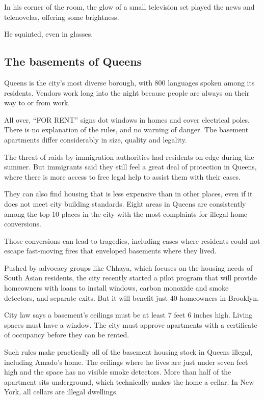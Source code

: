 In his corner of the room, the glow of a small television set played the
news and telenovelas, offering some brightness.

He squinted, even in glasses.

\hypertarget{the-basements-of-queens}{%
\subsection{The basements of Queens}\label{the-basements-of-queens}}

Queens is the city's most diverse borough, with 800 languages spoken
among its residents. Vendors work long into the night because people are
always on their way to or from work.

All over, ``FOR RENT'' signs dot windows in homes and cover electrical
poles. There is no explanation of the rules, and no warning of danger.
The basement apartments differ considerably in size, quality and
legality.

The threat of raids by immigration authorities had residents on edge
during the summer. But immigrants said they still feel a great deal of
protection in Queens, where there is more access to free legal help to
assist them with their cases.

They can also find housing that is less expensive than in other places,
even if it does not meet city building standards. Eight areas in Queens
are consistently among the top 10 places in the city with the most
complaints for illegal home conversions.

Those conversions can lead to tragedies, including cases where residents
could not escape fast-moving fires that enveloped basements where they
lived.

Pushed by advocacy groups like Chhaya, which focuses on the housing
needs of South Asian residents, the city recently started a pilot
program that will provide homeowners with loans to install windows,
carbon monoxide and smoke detectors, and separate exits. But it will
benefit just 40 homeowners in Brooklyn.

City law says a basement's ceilings must be at least 7 feet 6 inches
high. Living spaces must have a window. The city must approve apartments
with a certificate of occupancy before they can be rented.

Such rules make practically all of the basement housing stock in Queens
illegal, including Amado's home. The ceilings where he lives are just
under seven feet high and the space has no visible smoke detectors. More
than half of the apartment sits underground, which technically makes the
home a cellar. In New York, all cellars are illegal dwellings.

